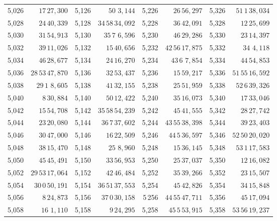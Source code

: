 \begin{tabular}{|r|r||r|r||r|r||r|r|}
5,026 & \(17\,27,\!300\) & 5,126 & \(50\,\,3,\!144\) & 5,226 & \(26\,56,\!297\) & 5,326 & \(51\,1\,38,\!034\) \\
5,028 & \(24\,40,\!339\) & 5,128 & \(34\,58\,34,\!092\) & 5,228 & \(36\,42,\!091\) & 5,328 & \(12\,25,\!699\) \\[1pt]
5,030 & \(31\,54,\!913\) & 5,130 & \(35\,7\,\,6,\!596\) & 5,230 & \(46\,29,\!286\) & 5,330 & \(23\,14,\!397\) \\[1pt]
5,032 & \(39\,11,\!026\) & 5,132 & \(15\,40,\!656\) & 5,232 & \(42\,56\,17,\!875\) & 5,332 & \(34\,\,4,\!118\) \\
5,034 & \(46\,28,\!677\) & 5,134 & \(24\,16,\!270\) & 5,234 & \(43\,6\,\,7,\!854\) & 5,334 & \(44\,54,\!853\) \\
5,036 & \(28\,53\,47,\!870\) & 5,136 & \(32\,53,\!437\) & 5,236 & \(15\,59,\!217\) & 5,336 & \(51\,55\,16,\!592\) \\
5,038 & \(29\,1\,\,8,\!605\) & 5,138 & \(41\,32,\!155\) & 5,238 & \(25\,51,\!959\) & 5,338 & \(52\,6\,39,\!326\) \\[1pt]
5,040 & \(8\,30,\!884\) & 5,140 & \(50\,12,\!422\) & 5,240 & \(35\,16,\!073\) & 5,340 & \(17\,33,\!046\) \\[1pt]
5,042 & \(15\,54,\!708\) & 5,142 & \(35\,58\,54,\!239\) & 5,242 & \(45\,41,\!555\) & 5,342 & \(28\,27,\!742\) \\
5,044 & \(23\,20,\!080\) & 5,144 & \(36\,7\,37,\!602\) & 5,244 & \(43\,55\,38,\!398\) & 5,344 & \(39\,23,\!403\) \\
5,046 & \(30\,47,\!000\) & 5,146 & \(16\,22,\!509\) & 5,246 & \(44\,5\,36,\!597\) & 5,346 & \(52\,50\,20,\!020\) \\
5,048 & \(38\,15,\!470\) & 5,148 & \(25\,\,8,\!960\) & 5,248 & \(15\,36,\!145\) & 5,348 & \(53\,1\,17,\!583\) \\[1pt]
5,050 & \(45\,45,\!491\) & 5,150 & \(33\,56,\!953\) & 5,250 & \(25\,37,\!037\) & 5,350 & \(12\,16,\!082\) \\[1pt]
5,052 & \(29\,53\,17,\!064\) & 5,152 & \(42\,46,\!484\) & 5,252 & \(35\,39,\!266\) & 5,352 & \(23\,15,\!507\) \\
5,054 & \(30\,0\,50,\!191\) & 5,154 & \(36\,51\,37,\!553\) & 5,254 & \(45\,42,\!826\) & 5,354 & \(34\,15,\!848\) \\
5,056 & \(8\,24,\!873\) & 5,156 & \(37\,0\,30,\!158\) & 5\,256 & \(44\,55\,47,\!711\) & 5,356 & \(45\,17,\!094\) \\
5,058 & \(16\,\,1,\!110\) & 5,158 & \(9\,24,\!295\) & 5,258 & \(45\,5\,53,\!915\) & 5,358 & \(53\,56\,19,\!237\) \\[1pt]

\end{tabular}
